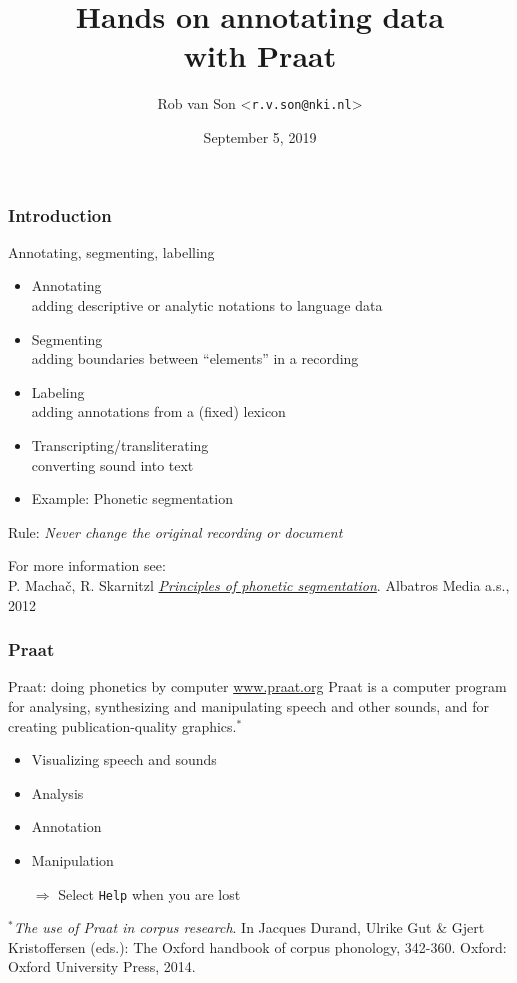\documentclass{beamer}
\title{Hands on annotating data\\ with Praat}
\date{September 5, 2019}
\author{Rob van Son <\texttt{r.v.son@nki.nl}>}
\begin{document}
\begin{frame}[plain]
\titlepage
\end{frame}


\begin{frame} 
\frametitle{Introduction} 
\begin{block}{Annotating, segmenting, labelling}
\begin{itemize} 
\item Annotating\\ adding descriptive or analytic notations to language data
\item Segmenting\\ adding boundaries between ``elements'' in a recording
\item Labeling\\ adding annotations from a (fixed) lexicon
\item Transcripting/transliterating\\ converting sound into text
\item Example: Phonetic segmentation
\end{itemize}
\end{block} 
Rule: \textit{Never change the original recording or document}

\vskip 0.5cm
\scriptsize{For more information see:\\ P. Machač, R. Skarnitzl
 \textit{\href{https://www.researchgate.net/publication/234052076_Principles_of_Phonetic_Segmentation}{Principles of phonetic segmentation}}. Albatros Media a.s., 2012}
\end{frame}


\begin{frame} 
\frametitle{Praat} 
\begin{block}{Praat: doing phonetics by computer \hskip 0.5cm \url{www.praat.org}}
Praat is a computer program for analysing, synthesizing and manipulating speech and other sounds, and for creating publication-quality graphics.$^*$
\end{block} 
\begin{itemize} 
\item Visualizing speech and sounds
\item Analysis
\item Annotation
\item Manipulation
\item[$\Rightarrow$] Select \texttt{Help} when you are lost
\end{itemize}

\vskip 0.3cm
\scriptsize{$^*$\textit{The use of Praat in corpus research}.
In Jacques Durand, Ulrike Gut \& Gjert Kristoffersen (eds.): The Oxford handbook of corpus phonology, 342-360. Oxford: Oxford University Press, 2014.}
\end{frame}
\end{document}
